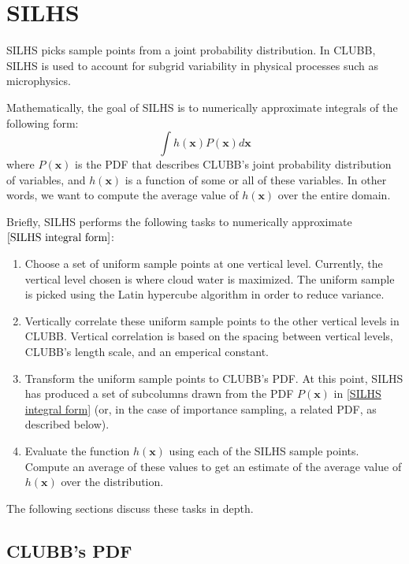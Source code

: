 \documentclass[11pt,fleqn]{article}
\begin{document}
\section{SILHS}

SILHS picks sample points from a joint probability distribution. In CLUBB, SILHS
is used to account for subgrid variability in physical processes such as
microphysics.

Mathematically, the goal of SILHS is to numerically approximate integrals of the
following form:
\begin{equation}
\int h(\mathbf{x}) P(\mathbf{x}) d\mathbf{x} \label{SILHS integral form}
\end{equation}
where $P(\mathbf{x})$ is the PDF that describes CLUBB's joint probability
distribution of variables, and $h(\mathbf{x})$ is a function of some or all of
these variables. In other words, we want to compute the average value of
$h(\mathbf{x})$ over the entire domain.

Briefly, SILHS performs the following tasks to numerically approximate
$\eqref{SILHS integral form}$:
\begin{enumerate}
\item Choose a set of uniform sample points at one vertical level. Currently,
the vertical level chosen is where cloud water is maximized. The uniform sample
is picked using the Latin hypercube algorithm in order to reduce variance.
\item Vertically correlate these uniform sample points to the other vertical
levels in CLUBB. Vertical correlation is based on the spacing between vertical
levels, CLUBB's length scale, and an emperical constant.
\item Transform the uniform sample points to CLUBB's PDF. At this point, SILHS
has produced a set of subcolumns drawn from the PDF $P(\mathbf{x})$ in
\eqref{SILHS integral form} (or, in the case of importance sampling, a related
PDF, as described below).
\item Evaluate the function $h(\mathbf{x})$ using each of the SILHS sample
points. Compute an average of these values to get an estimate of the average
value of $h(\mathbf{x})$ over the distribution.
\end{enumerate}

The following sections discuss these tasks in depth.

\subsection{CLUBB's PDF}
\end{document}
